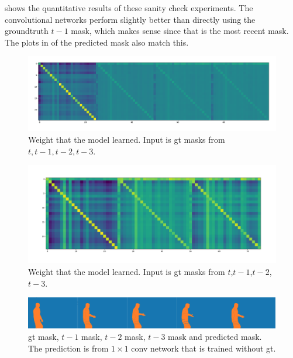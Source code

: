  shows the quantitative results of these sanity check experiments. The convolutional networks perform slightly better than directly using the groundtruth $t-1$ mask, which makes sense since that is the most recent mask. The plots in   of the predicted mask also match this.

\begin{figure}
\centering
\includegraphics[scale=0.22]{fig/weights_4.png}
\caption{Weight that the model learned. Input is gt masks from $t,t-1,t-2,t-3$. }
\label{fig:w4}
\end{figure}
\begin{figure}
\centering
\includegraphics[scale=0.22]{fig/weights_3.png}
\caption{Weight that the model learned. Input is gt masks from $t$,$t-1$,$t-2$,$t-3$.}
\label{fig:w3}
\end{figure}

\begin{figure}
\centering
\includegraphics[scale=0.23]{fig/pred.png}
\caption{gt mask, $t-1$ mask, $t-2$ mask, $t-3$ mask and predicted mask. The prediction is from $1\times 1$ conv network that is trained without gt.}
\label{fig:plot1}
\end{figure}




